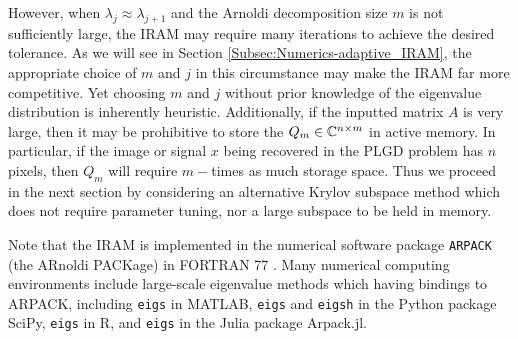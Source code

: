 However, when $\lambda_j \approx \lambda_{j+1}$ and the Arnoldi decomposition size $m$ is not sufficiently large, the IRAM may require many iterations to achieve the desired tolerance. 
 As we will see in Section \ref{Subsec:Numerics-adaptive_IRAM}, the appropriate choice of $m$ and $j$ in this circumstance may make the IRAM far more competitive.  
Yet choosing $m$ and $j$ without prior knowledge of the eigenvalue distribution is inherently heuristic.  
Additionally, if the inputted matrix $A$ is very large, then it may be prohibitive to store the $Q_m \in {\mathbb C}^{n \times m}$ in active memory.  In particular, if the image or signal $x$ being recovered in the PLGD problem has $n$ pixels, then $Q_m$ will require $m-$times as much storage space.  
Thus we proceed in the next section by considering an alternative Krylov subspace method which does not require parameter tuning, nor a large subspace to be held in memory.


Note that the IRAM is implemented in the numerical software package \texttt{ARPACK} (the ARnoldi PACKage) in FORTRAN 77 \cite{lehoucq1998arpack}.  Many numerical computing environments include large-scale eigenvalue methods which having bindings to ARPACK, including \texttt{eigs} in MATLAB, \texttt{eigs} and \texttt{eigsh} in the Python package SciPy, \texttt{eigs} in R, and \texttt{eigs} in the Julia package Arpack.jl. 




